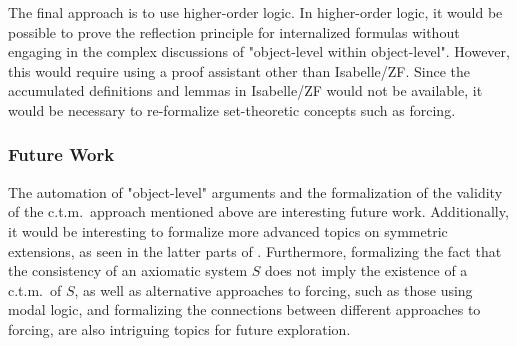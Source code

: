 \documentclass{report}
\begin{document}
The final approach is to use higher-order logic. 
In higher-order logic, it would be possible to prove the reflection principle for internalized formulas 
without engaging in the complex discussions of "object-level within object-level". 
However, this would require using a proof assistant other than Isabelle/ZF. 
Since the accumulated definitions and lemmas in Isabelle/ZF would not be available, 
it would be necessary to re-formalize set-theoretic concepts such as forcing.

\subsubsection{Future Work}
The automation of "object-level" arguments and the formalization of the validity of the c.t.m.\ approach mentioned above are interesting future work. 
Additionally, it would be interesting to formalize more advanced topics on symmetric extensions, 
as seen in the latter parts of \cite{karagila}. 
Furthermore, formalizing the fact that the consistency of an axiomatic system $S$ does not imply the existence of a c.t.m.\ of $S$, 
as well as alternative approaches to forcing, 
such as those using modal logic, 
and formalizing the connections between different approaches to forcing, 
are also intriguing topics for future exploration.
\printbibliography
\end{document}
